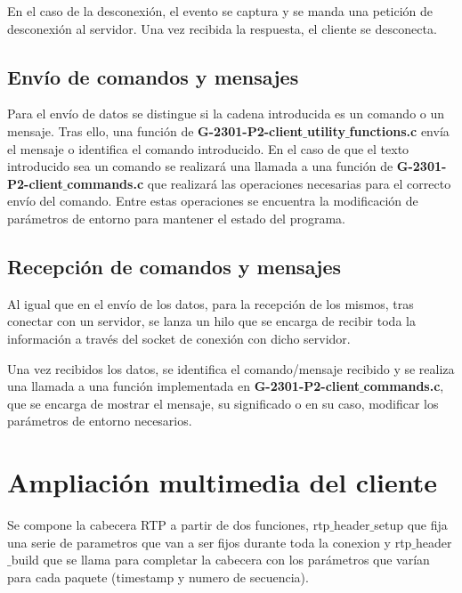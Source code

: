 \documentclass{mathnotes}
\begin{document}
En el caso de la desconexión, el evento se captura y se manda una petición de desconexión al servidor. Una vez recibida la respuesta, el cliente se desconecta.

\subsection{Envío de comandos y mensajes}
Para el envío de datos se distingue si la cadena introducida es un comando o un mensaje.
Tras ello, una función de \textbf{G-2301-P2-client$\_$utility$\_$functions.c} envía el mensaje o identifica el comando introducido. En el caso de que el texto introducido sea un comando se realizará una llamada a una función de \textbf{G-2301-P2-client$\_$commands.c} que realizará las operaciones necesarias para el correcto envío del comando. Entre estas operaciones se encuentra la modificación de parámetros de entorno para mantener el estado del programa.

\subsection{Recepción de comandos y mensajes}
Al igual que en el envío de los datos, para la recepción de los mismos, tras conectar con un servidor, se lanza un hilo que se encarga de recibir toda la información a través del socket de conexión con dicho servidor.

Una vez recibidos los datos, se identifica el comando/mensaje recibido y se realiza una llamada a una función implementada en \textbf{G-2301-P2-client$\_$commands.c}, que se encarga de mostrar el mensaje, su significado o en su caso, modificar los parámetros de entorno necesarios.

\section{Ampliación multimedia del cliente}
Se compone la cabecera RTP a partir de dos funciones, rtp$\_$header$\_$setup que fija una serie de parametros que van a ser fijos durante toda la conexion y rtp$\_$header$\_$build que se llama para completar la cabecera con los parámetros que varían para cada paquete (timestamp y numero de secuencia).
\end{document}
